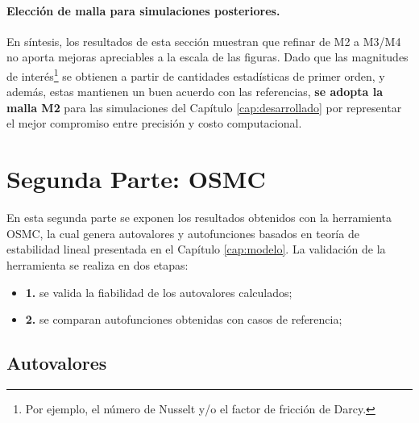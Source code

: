 \paragraph{Elección de malla para simulaciones posteriores.}

En síntesis, los resultados de esta sección muestran que refinar de M2 a M3/M4 no aporta mejoras apreciables a la escala de las figuras. Dado que las magnitudes de interés\footnote{Por ejemplo, el número de Nusselt y/o el factor de fricción de Darcy.} se obtienen a partir de cantidades estadísticas de primer orden, y además, estas mantienen un buen acuerdo con las referencias, \textbf{se adopta la malla M2} para las simulaciones del Capítulo \ref{cap:desarrollado} por representar el mejor compromiso entre precisión y costo computacional.


\section{Segunda Parte: OSMC}

En esta segunda parte se exponen los resultados obtenidos con la herramienta OSMC, la cual genera autovalores y autofunciones basados en teoría de estabilidad lineal presentada en el Capítulo \ref{cap:modelo}. La validación de la herramienta se realiza en dos etapas: 

\begin{itemize}
	\item \textbf{1.} se valida la fiabilidad de los autovalores calculados;
	\item \textbf{2.} se comparan autofunciones obtenidas con casos de referencia;
\end{itemize}

\subsection{Autovalores}

